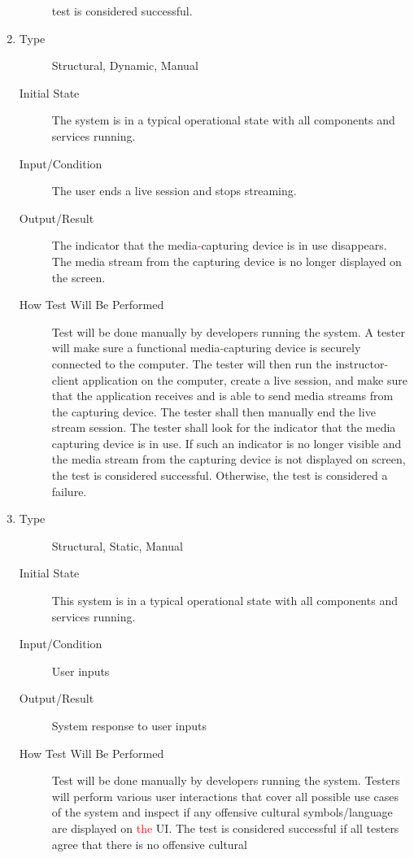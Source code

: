 \documentclass[12pt, titlepage]{article}
\newcommand{\rt}[1]{\textcolor{red}{#1}}
\begin{document}
\begin{enumerate}[NFR-T1]
\begin{description}
    test is considered successful.
  \end{description}
\item \label{NFRT26}
  \begin{description}
  \item[Type] Structural, Dynamic, Manual
  \item[Initial State] The system is in a typical operational state with all
    components and services running.
  \item[Input/Condition] The user ends a live session and stops streaming.
  \item[Output/Result] The indicator that the media\rt{-}capturing device is in use
    disappears. The media stream from the capturing device is no longer
    displayed on the screen.
  \item[How Test Will Be Performed] Test will be done manually by developers
    running the system. A tester will make sure a functional media\rt{-}capturing
    device is securely connected to the computer. The tester will then run the
    instructor\rt{-}client application on the computer, create a live session, and
    make sure that the application receives and is able to send media streams
    from the capturing device. The tester shall then manually end the live
    stream session. The tester shall look for the indicator that the media
    capturing device is in use. If such an indicator is no longer visible and
    the media stream from the capturing device is not displayed on screen, the
    test is considered successful. Otherwise, the test is considered a failure.
  \end{description}
\item \label{NFRT27}
  \begin{description}
  \item[Type] Structural, Static, Manual
  \item[Initial State] This system is in a typical operational state with all
    components and services running.
  \item[Input/Condition] User inputs
  \item[Output/Result] System response to user inputs
  \item[How Test Will Be Performed] Test will be done manually by developers
    running the system. Testers will perform various user interactions that
    cover all possible use cases of the system and inspect if any offensive
    cultural symbols/language are displayed on \rt{the} UI. The test is considered
    successful if all testers agree that there is no offensive cultural

\end{description}
\end{enumerate}
\end{document}
